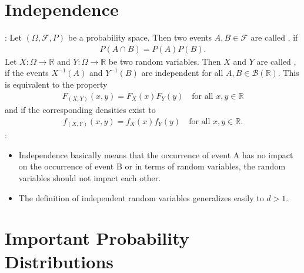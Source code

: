 \documentclass[letterpaper,10pt,english]{jupyterBook}
\begin{document}
\section{Independence}
\label{\detokenize{fund/fundprob:independence}}
\sphinxAtStartPar
{}: Let \((\Omega, \mathcal{F}, P)\) be a probability space. Then two events \(A, B \in \mathcal{F}\) are called , if
\begin{equation*}
\begin{split} P(A \cap B) = P(A) P(B).\end{split}
\end{equation*}
\sphinxAtStartPar
Let \(X: \Omega \rightarrow \mathbb{R}\) and \(Y: \Omega \rightarrow \mathbb{R}\) be two random variables. Then \(X\) and \(Y\) are called , if the events \(X^{-1}(A)\) and \(Y^{-1}(B)\) are independent for all \(A, B \in \mathcal{B}(\mathbb{R})\). This is equivalent to the property
\begin{equation*}
\begin{split}F_{(X, Y)}(x, y) = F_X(x) F_Y(y) \quad \text{for all } x,y \in \mathbb{R}\end{split}
\end{equation*}
\sphinxAtStartPar
and if the corresponding densities exist to
\begin{equation*}
\begin{split}f_{(X, Y)}(x, y) = f_X(x) f_Y(y) \quad \text{for all } x,y \in \mathbb{R}.\end{split}
\end{equation*}
\sphinxAtStartPar
{}:
\begin{itemize}
\item {} 
\sphinxAtStartPar
Independence basically means that the occurrence of event A has no impact on the occurrence of event B or in terms of random variables, the random variables should not impact each other.

\item {} 
\sphinxAtStartPar
The definition of independent random variables generalizes easily to \(d > 1\).

\end{itemize}


\section{Important Probability Distributions}
\label{\detokenize{fund/fundprob:important-probability-distributions}}
\end{document}
